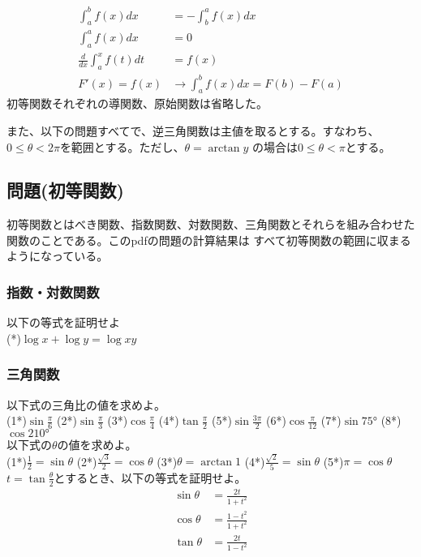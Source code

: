 \documentclass[a4j,dvipdfmx]{jsarticle}
\begin{document}
\begin{align}
    \int_a^b f(x)dx &= -\int_b^a f(x) dx\\
    \int_a^a f(x)dx &= 0\\
    \frac{d}{dx}\int_a^x f(t)dt &=f(x)\\
    F'(x)=f(x)&\to\int_a^b f(x)dx = F(b)-F(a)
\end{align}
初等関数それぞれの導関数、原始関数は省略した。

また、以下の問題すべてで、逆三角関数は主値を取るとする。すなわち、$0\leq\theta<2\pi$を範囲とする。ただし、$\theta=\arctan y$
の場合は$0\leq\theta<\pi$とする。
\newpage
\subsection*{問題(初等関数)}
初等関数とはべき関数、指数関数、対数関数、三角関数とそれらを組み合わせた関数のことである。このpdfの問題の計算結果は
すべて初等関数の範囲に収まるようになっている。
\subsubsection*{指数・対数関数}
以下の等式を証明せよ\\
(*)$\log x+\log y = \log xy$
\subsubsection*{三角関数}
以下式の三角比の値を求めよ。\\
(1*)$\sin\frac{\pi}{6}$
\hspace{10mm}
(2*)$\sin\frac{\pi}{3}$
\hspace{10mm}
(3*)$\cos \frac{\pi}{4}$
\hspace{10mm}
(4*)$\tan \frac{\pi}{2}$
\hspace{10mm}
(5*)$\sin \frac{3\pi}{2}$
\hspace{10mm}
(6*)$\cos \frac{\pi}{12}$
\hspace{10mm}
(7*)$\sin \ang{75}$
\hspace{10mm}
(8*)$\cos \ang{210}$
\\
以下式の$\theta$の値を求めよ。\\
(1*)$\frac{1}{2}=\sin \theta$
\hspace{10mm}
(2*)$\frac{\sqrt{3}}{2}=\cos \theta$
\hspace{10mm}
(3*)$\theta=\arctan 1$
\hspace{10mm}
(4*)$\frac{\sqrt{2}}{5}=\sin \theta$
\hspace{10mm}
(5*)$\pi=\cos \theta$
\\
$t=\tan\frac{\theta}{2}$とするとき、以下の等式を証明せよ。\\
\begin{align*}
    \sin \theta &= \frac{2t}{1+t^2}\\
    \cos \theta &= \frac{1-t^2}{1+t^2}\\
    \tan \theta &= \frac{2t}{1-t^2}\\
\end{align*}
\newpage
\end{document}
